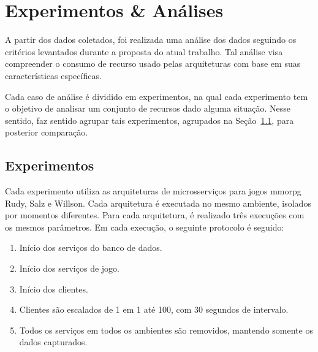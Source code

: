 \chapter{Experimentos \& Análises}
\label{cap6}



A partir dos dados coletados, foi realizada uma análise dos dados seguindo os critérios levantados durante a proposta do atual trabalho.
%
Tal análise visa compreender o consumo de recurso usado pelas arquiteturas com base em suas características específicas.



Cada caso de análise é dividido em experimentos, na qual cada experimento tem o objetivo de analisar um conjunto de recursos dado alguma situação.
%
Nesse sentido, faz sentido agrupar tais experimentos, agrupados na Seção~\ref{sec:experimentos}, para posterior comparação.





\section{Experimentos}
\label{sec:experimentos}



Cada experimento utiliza as arquiteturas de microsserviços para jogos \ac{mmorpg} Rudy, Salz e Willson.
%
Cada arquitetura é executada no mesmo ambiente, isolados por momentos diferentes.
%
Para cada arquitetura, é realizado três execuções com os mesmos parâmetros.
%
Em cada execução, o seguinte protocolo é seguido:


\begin{enumerate}
 \item Início dos serviços do banco de dados.
 \item Início dos serviços de jogo.
 \item Início dos clientes.
 \item Clientes são escalados de 1 em 1 até 100, com 30 segundos de intervalo.
 \item Todos os serviços em todos os ambientes são removidos, mantendo somente os dados capturados.
\end{enumerate}


